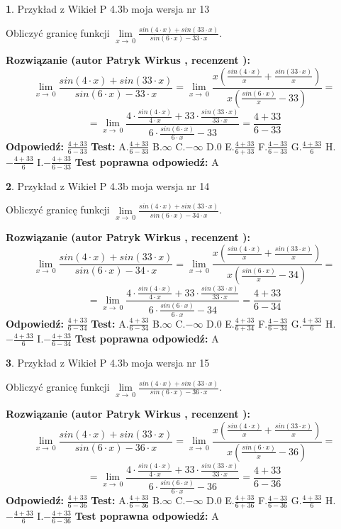 \documentclass[12pt, a4paper]{article}
\theoremstyle{definition} %
\newtheorem{zad}{}
\newcommand{\zadStart}[1]{\begin{zad}#1\newline}
\newcommand{\zadStop}{\end{zad}}
\newcommand{\rozwStart}[2]{\noindent \textbf{Rozwiązanie (autor #1 , recenzent #2): }\newline}
\newcommand{\rozwStop}{\newline}
\newcommand{\odpStart}{\noindent \textbf{Odpowiedź:}\newline}
\newcommand{\odpStop}{\newline}
\newcommand{\testStart}{\noindent \textbf{Test:}\newline}
\newcommand{\testStop}{\newline}
\newcommand{\kluczStart}{\noindent \textbf{Test poprawna odpowiedź:}\newline}
\newcommand{\kluczStop}{\newline}
\begin{document}
\zadStart{Przykład z Wikieł P 4.3b moja wersja nr 13}


Obliczyć granicę funkcji $\lim\limits_{x\to\ 0}\frac{sin(4 \cdot x)+sin(33 \cdot x)}{sin(6 \cdot x)-33 \cdot x}$.
\zadStop
\rozwStart{Patryk Wirkus}{}
$$\lim\limits_{x\to\ 0}\frac{sin(4 \cdot x)+sin(33 \cdot x)}{sin(6 \cdot x)-33 \cdot x}=\lim\limits_{x\to\ 0}\frac{x(\frac{sin(4 \cdot x)}{x}+\frac{sin(33 \cdot x)}{x})}{x(\frac{sin(6 \cdot x)}{x}-33)}=$$
$$=\lim\limits_{x\to\ 0}\frac{4 \cdot \frac{sin(4 \cdot x)}{4 \cdot x}+33 \cdot \frac{sin(33 \cdot x)}{33 \cdot x}}{6 \cdot \frac{sin(6 \cdot x)}{6 \cdot x}-33}=\frac{4+33}{6-33}$$
\rozwStop
\odpStart
$\frac{4+33}{6-33}$
\odpStop
\testStart
A.$\frac{4+33}{6-33}$
B.$\infty$
C.$-\infty$
D.$0$
E.$\frac{4+33}{6+33}$
F.$\frac{4-33}{6-33}$
G.$\frac{4+33}{6}$
H.$-\frac{4+33}{6}$
I.$-\frac{4+33}{6-33}$
\testStop
\kluczStart
A
\kluczStop



\zadStart{Przykład z Wikieł P 4.3b moja wersja nr 14}


Obliczyć granicę funkcji $\lim\limits_{x\to\ 0}\frac{sin(4 \cdot x)+sin(33 \cdot x)}{sin(6 \cdot x)-34 \cdot x}$.
\zadStop
\rozwStart{Patryk Wirkus}{}
$$\lim\limits_{x\to\ 0}\frac{sin(4 \cdot x)+sin(33 \cdot x)}{sin(6 \cdot x)-34 \cdot x}=\lim\limits_{x\to\ 0}\frac{x(\frac{sin(4 \cdot x)}{x}+\frac{sin(33 \cdot x)}{x})}{x(\frac{sin(6 \cdot x)}{x}-34)}=$$
$$=\lim\limits_{x\to\ 0}\frac{4 \cdot \frac{sin(4 \cdot x)}{4 \cdot x}+33 \cdot \frac{sin(33 \cdot x)}{33 \cdot x}}{6 \cdot \frac{sin(6 \cdot x)}{6 \cdot x}-34}=\frac{4+33}{6-34}$$
\rozwStop
\odpStart
$\frac{4+33}{6-34}$
\odpStop
\testStart
A.$\frac{4+33}{6-34}$
B.$\infty$
C.$-\infty$
D.$0$
E.$\frac{4+33}{6+34}$
F.$\frac{4-33}{6-34}$
G.$\frac{4+33}{6}$
H.$-\frac{4+33}{6}$
I.$-\frac{4+33}{6-34}$
\testStop
\kluczStart
A
\kluczStop



\zadStart{Przykład z Wikieł P 4.3b moja wersja nr 15}


Obliczyć granicę funkcji $\lim\limits_{x\to\ 0}\frac{sin(4 \cdot x)+sin(33 \cdot x)}{sin(6 \cdot x)-36 \cdot x}$.
\zadStop
\rozwStart{Patryk Wirkus}{}
$$\lim\limits_{x\to\ 0}\frac{sin(4 \cdot x)+sin(33 \cdot x)}{sin(6 \cdot x)-36 \cdot x}=\lim\limits_{x\to\ 0}\frac{x(\frac{sin(4 \cdot x)}{x}+\frac{sin(33 \cdot x)}{x})}{x(\frac{sin(6 \cdot x)}{x}-36)}=$$
$$=\lim\limits_{x\to\ 0}\frac{4 \cdot \frac{sin(4 \cdot x)}{4 \cdot x}+33 \cdot \frac{sin(33 \cdot x)}{33 \cdot x}}{6 \cdot \frac{sin(6 \cdot x)}{6 \cdot x}-36}=\frac{4+33}{6-36}$$
\rozwStop
\odpStart
$\frac{4+33}{6-36}$
\odpStop
\testStart
A.$\frac{4+33}{6-36}$
B.$\infty$
C.$-\infty$
D.$0$
E.$\frac{4+33}{6+36}$
F.$\frac{4-33}{6-36}$
G.$\frac{4+33}{6}$
H.$-\frac{4+33}{6}$
I.$-\frac{4+33}{6-36}$
\testStop
\kluczStart
A
\kluczStop
\end{document}
